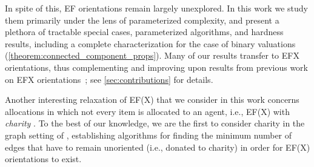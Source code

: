     In spite of this, EF orientations remain largely unexplored.
    In this work we study them primarily under the lens of parameterized complexity, and present a plethora of tractable special cases, parameterized algorithms, and hardness results, including a complete characterization for the case of binary valuations (\cref{theorem:connected_component_props}). Many of our results transfer to EFX orientations, thus complementing and improving upon results from previous work on EFX orientations~\cite{AfshinmehrDKMR25,sagt/BlazejGRS25,ijcai/DeligkasEGK25}; see \cref{sec:contributions} for details.

    Another interesting relaxation of EF(X) that we consider in this work concerns allocations in which not every item is allocated to an agent, i.e., EF(X) with \emph{charity} \cite{CGH19}.
    To the best of our knowledge, we are the first to consider charity in the graph setting of \cite{EFXgraphs}, establishing algorithms for finding the minimum number of edges that have to remain unoriented (i.e., donated to charity) in order for EF(X) orientations to exist.



